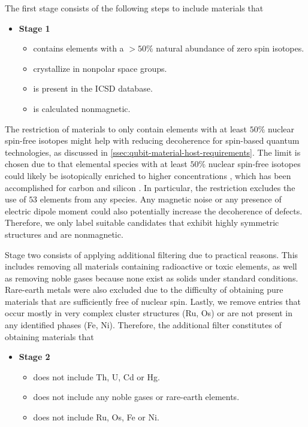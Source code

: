 The first stage consists of the following steps to include materials that
\begin{itemize}
  \item[]{\textbf{Stage 1}}
  \begin{itemize}
  \item contains elements with a $>50\%$ natural abundance of zero spin isotopes.
  \item crystallize in nonpolar space groups.
  \item is present in the ICSD database.
  \item is calculated nonmagnetic.
  \end{itemize}
\end{itemize}

\noindent The restriction of materials to only contain elements with at least $50\%$ nuclear spin-free isotopes might help with reducing decoherence for spin-based quantum technologies, as discussed in \autoref{ssec:qubit-material-host-requirements}.
The limit is chosen due to that elemental species with at least $50\%$ nuclear spin-free isotopes could likely be isotopically enriched to higher concentrations \cite{Ferrenti2020}, which has been accomplished for carbon \cite{Markham2011, Balasubramanian2009} and silicon \cite{Tyryshkin2011}. In particular, the restriction excludes the use of $53$ elements from any species. Any magnetic noise or any presence of electric dipole moment could also potentially increase the decoherence of defects. Therefore, we only label suitable candidates that exhibit highly symmetric structures and are nonmagnetic.

Stage two consists of applying additional filtering due to practical reasons. This includes removing all materials containing radioactive or toxic elements, as well as removing noble gases because none exist as solids under standard conditions. Rare-earth metals were also excluded due to the difficulty of obtaining pure materials that are sufficiently free of nuclear spin. Lastly, we remove entries that occur mostly in very complex cluster structures (Ru, Os) or are not present in any identified phases (Fe, Ni). Therefore, the additional filter constitutes of obtaining materials that
\begin{itemize}
  \item[]{\textbf{Stage 2}}
  \begin{itemize}
  \item does not include Th, U, Cd or Hg.
  \item does not include any noble gases or rare-earth elements.
  \item does not include Ru, Os, Fe or Ni.
  \end{itemize}
\end{itemize}

